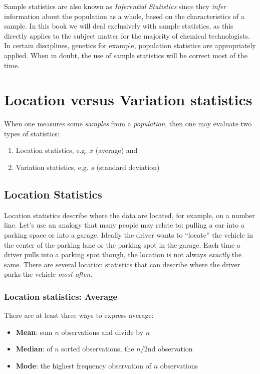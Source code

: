Sample statistics are also known as \textsl{Inferential Statistics} since they \textsl{infer} information about the population as a whole, based on the characteristics of a sample.  In this book we will deal exclusively with sample statistics, as this directly applies to the subject matter for the majority of chemical technologists.  In certain disciplines, genetics for example, population statistics are appropriately applied.  When in doubt, the use of sample statistics will be correct most of the time.

\section{Location versus Variation statistics}

When one measures some \textsl{samples} from a \textsl{population}, then one may evaluate two types of statistics:

\begin{enumerate}
\item Location statistics, e.g. $ \bar{x} $ (average) and 
\item Variation statistics, e.g. $ s $ (standard deviation) 
\end{enumerate}
\subsection{Location Statistics}

Location statistics describe where the data are located, for example, on a number line.  Let's use an analogy that many people may relate to: pulling a car into a parking space or into a garage.  Ideally the driver wants to ``locate'' the vehicle in the center of the parking lane or the parking spot in the garage.  Each time a driver pulls into a parking spot though, the location is not always \textit{exactly} the same. There are several location statistics that can describe where the driver parks the vehicle \textit{most often}.

\subsubsection{Location statistics: Average}
 
 There are at least three ways to express average:
\begin{itemize}
  \item \textbf{Mean}:	sum $ n $ observations and divide by $ n $
  \item \textbf{Median}:	of $ n $ sorted observations, the $ n/2 $nd observation
  \item \textbf{Mode}:	the highest frequency observation of $ n $ observations
\end{itemize}

